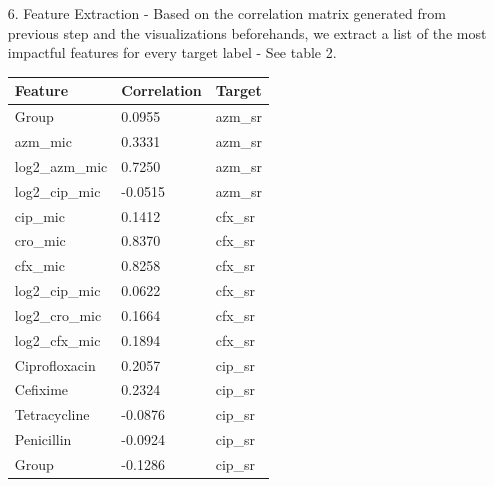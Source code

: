 \documentclass[manuscript,screen,review, nonacm]{acmart}
\begin{document}
\begin{itemize}
    \item[6.] Feature Extraction - Based on the correlation matrix generated from previous step and the visualizations beforehands, we extract a list of the most
    impactful features for every target label - See table 2.
            \begin{table}[H]
                \centering
                \begin{tabular}{|l|l|l|}
                \hline
                \textbf{Feature}           & \textbf{Correlation} & \textbf{Target} \\ \hline
                Group                      & 0.0955               & azm\_sr         \\ \hline
                azm\_mic                   & 0.3331               & azm\_sr         \\ \hline
                log2\_azm\_mic             & 0.7250               & azm\_sr         \\ \hline
                log2\_cip\_mic             & -0.0515              & azm\_sr         \\ \hline
                cip\_mic                   & 0.1412               & cfx\_sr         \\ \hline
                cro\_mic                   & 0.8370               & cfx\_sr         \\ \hline
                cfx\_mic                   & 0.8258               & cfx\_sr         \\ \hline
                log2\_cip\_mic             & 0.0622               & cfx\_sr         \\ \hline
                log2\_cro\_mic             & 0.1664               & cfx\_sr         \\ \hline
                log2\_cfx\_mic             & 0.1894               & cfx\_sr         \\ \hline
                Ciprofloxacin              & 0.2057               & cip\_sr         \\ \hline
                Cefixime                   & 0.2324               & cip\_sr         \\ \hline
                Tetracycline               & -0.0876              & cip\_sr         \\ \hline
                Penicillin                 & -0.0924              & cip\_sr         \\ \hline
                Group                      & -0.1286              & cip\_sr         \\ \hline

\end{tabular}
\end{table}
\end{itemize}
\end{document}
